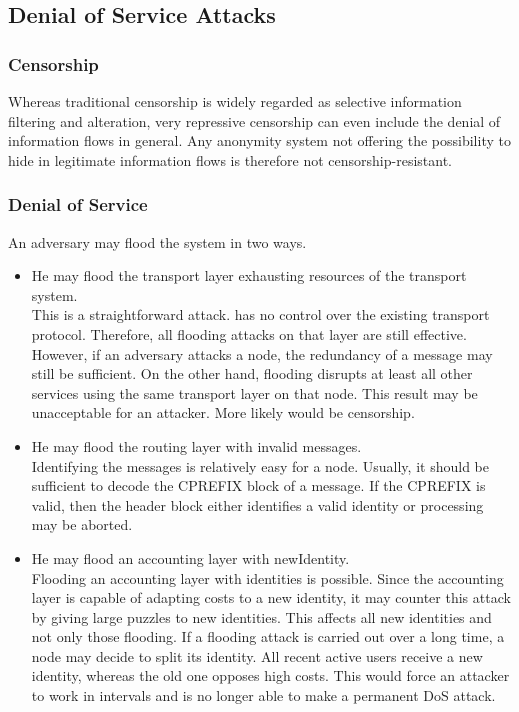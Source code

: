 \subsection{Denial of Service Attacks}
\subsubsection{Censorship}
Whereas traditional censorship is widely regarded as selective information filtering and alteration, very repressive censorship can even include the denial of information flows in general. Any anonymity system not offering the possibility to hide in legitimate information flows is therefore not censorship-resistant.

\subsubsection{Denial of Service}
An adversary may flood the system in two ways.
\begin{itemize}
	\item He may flood the transport layer exhausting resources of the transport system.\\
	This is a straightforward attack. \MessageVortex{} has no control over the existing transport protocol. Therefore, all flooding attacks on that layer are still effective. However, if an adversary attacks a node, the redundancy of a message may still be sufficient. On the other hand, flooding disrupts at least all other services using the same transport layer on that node. This result may be unacceptable for an attacker. More likely would be censorship.
	\item He may flood the routing layer with invalid messages.\\ 
	Identifying the messages is relatively easy for a node. Usually, it should be sufficient to decode the CPREFIX block of a message. If the CPREFIX is valid, then the header block either identifies a valid identity or processing may be aborted. 
	\item He may flood an accounting layer with newIdentity.\\
	Flooding an accounting layer with identities is possible. Since the accounting layer is capable of adapting costs to a new identity, it may counter this attack by giving large puzzles to new identities. This affects all new identities and not only those flooding. If a flooding attack is carried out over a long time, a node may decide to split its identity. All recent active users receive a new identity, whereas the old one opposes high costs. This would force an attacker to work in intervals and is no longer able to make a permanent DoS attack.
\end{itemize}


